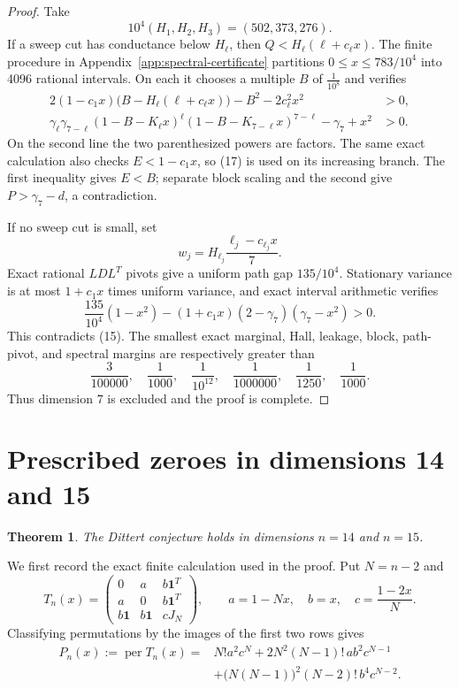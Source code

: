 \documentclass[10pt,a4paper]{amsart}
\newtheorem{theorem}{Theorem}[section]
\theoremstyle{definition}
\theoremstyle{remark}
\begin{document}
\begin{proof}
Take
\[
10^4(H_1,H_2,H_3)=(502,373,276).
\]
If a sweep cut has conductance below \(H_\ell\), then
\(Q<H_\ell(\ell+c_\ell x)\).  The finite procedure in
Appendix~\ref{app:spectral-certificate} partitions
\(0\leq x\leq783/10^4\) into 4096 rational intervals. On each it chooses a
multiple \(B\) of \(\frac1{10^8}\) and verifies
\[
\begin{split}
2(1-c_1x)\bigl(B-H_\ell(\ell+c_\ell x)\bigr)
 -B^2-2c_\ell^2x^2&>0,\\
\gamma_\ell\gamma_{7-\ell}
(1-B-K_\ell x)^\ell
(1-B-K_{7-\ell}x)^{7-\ell}
 -\gamma_7+x^2&>0.
\end{split}                                         \tag{18}
\]
On the second line the two parenthesized powers are factors.  The same
exact calculation
also checks \(E<1-c_1x\), so (17) is used on its increasing branch. The
first inequality gives \(E<B\); separate block scaling and the second give
\(P>\gamma_7-d\), a contradiction.

If no sweep cut is small, set
\[
w_j=H_{\ell_j}\frac{\ell_j-c_{\ell_j}x}{7}.
\]
Exact rational \(LDL^T\) pivots give a uniform path gap \(135/10^4\).
Stationary variance is at most \(1+c_1x\) times uniform variance, and exact
interval arithmetic verifies
\[
\frac{135}{10^4}(1-x^2)
 -(1+c_1x)(2-\gamma_7)(\gamma_7-x^2)>0.
\]
This contradicts (15). The smallest exact marginal, Hall, leakage, block,
path-pivot, and spectral margins are respectively greater than
\[
\frac3{100000},\quad\frac1{1000},\quad
\frac1{10^{12}},\quad\frac1{1000000},\quad
\frac1{1250},\quad\frac1{1000}.
\]
Thus dimension \(7\) is excluded and the proof is complete.
\end{proof}

\section{Prescribed zeroes in dimensions 14 and 15}\label{sec:twozero}

\begin{theorem}\label{thm:dittert-14-15}
The Dittert conjecture holds in dimensions \(n=14\) and \(n=15\).
\end{theorem}

We first record the exact finite calculation used in the proof. Put \(N=n-2\)
and
\[
 T_n(x)=
 \begin{pmatrix}
 0&a&b\mathbf1^T\\
 a&0&b\mathbf1^T\\
 b\mathbf1&b\mathbf1&cJ_N
 \end{pmatrix},
 \qquad
 a=1-Nx,\quad b=x,\quad c=\frac{1-2x}{N}.
\]
Classifying permutations by the images of the first two rows gives
\[
\begin{split}
 P_n(x):=\operatorname{per}T_n(x)
 ={}&N!a^2c^N+2N^2(N-1)!\,ab^2c^{N-1}\\
 &+\bigl(N(N-1)\bigr)^2(N-2)!\,b^4c^{N-2}.
\end{split}
\]
\end{document}

